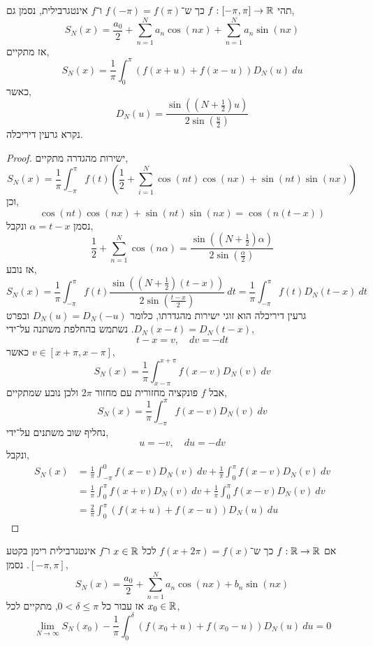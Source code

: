 \begin{theorem}
	תהי $f : [-\pi, \pi] \to \mathbb{R}$ כך ש־$f(-\pi) = f(\pi)$ ו־$f$ אינטגרבילית,
	נסמן גם,
	\[
		S_N(x)
		= \frac{a_0}{2} + \sum_{n = 1}^N a_n \cos(n x) + \sum_{n = 1}^N a_n \sin(n x)
	\]
	אז מתקיים,
	\[
		S_N(x)
		= \frac{1}{\pi} \int_{0}^{\pi} (f(x + u) + f(x - u)) D_N(u)\ du
	\]
	כאשר,
	\[
		D_N(u)
		= \frac{\sin( (N + \frac{1}{2})u)}{2 \sin(\frac{u}{2})}
	\]
	נקרא גרעין דיריכלה.
\end{theorem}
\begin{proof}
	ישירות מהגדרה מתקיים,
	\[
		S_N(x)
		= \frac{1}{\pi} \int_{-\pi}^{\pi} f(t) \left( \frac{1}{2} + \sum_{i = 1}^N \cos(nt) \cos(nx) + \sin(nt) \sin(nx) \right)
	\]
	וכן,
	\[
		\cos(nt) \cos(nx) + \sin(nt) \sin(nx)
		= \cos(n(t - x))
	\]
	נסמן $\alpha = t - x$ ונקבל,
	\[
		\frac{1}{2} + \sum_{n = 1}^N \cos(n \alpha)
		= \frac{\sin((N + \frac{1}{2}) \alpha)}{2 \sin(\frac{\alpha}{2})}
	\]
	אז נובע,
	\[
		S_N(x)
		= \frac{1}{\pi} \int_{-\pi}^{\pi} f(t) \frac{\sin((N + \frac{1}{2}) (t - x))}{2 \sin(\frac{t - x}{2})}\ dt
		= \frac{1}{\pi} \int_{-\pi}^{\pi} f(t) D_N(t - x)\ dt
	\]
	גרעין דיריכלה הוא זוגי ישירות מהגדרתו, כלומר $D_N(u) = D_N(-u)$ ובפרט $D_N(x - t) = D_N(t - x)$.
	נשתמש בהחלפת משתנה על־ידי,
	\[
		t - x = v,
		\quad
		dv = -dt
	\]
	כאשר $v \in [x + \pi, x - \pi]$,
	\[
		S_N(x)
		= \frac{1}{\pi} \int_{x - \pi}^{x + \pi} f(x - v) D_N(v)\ dv
	\]
	אבל $f$ פונקציה מחזורית עם מחזור $2 \pi$ ולכן נובע שמתקיים,
	\[
		S_N(x)
		= \frac{1}{\pi} \int_{-\pi}^{\pi} f(x - v) D_N(v)\ dv
	\]
	נחליף שוב משתנים על־ידי,
	\[
		u = -v,
		\quad
		du = -dv
	\]
	ונקבל,
	\begin{align*}
		S_N(x)
		& = \frac{1}{\pi} \int_{-\pi}^{0} f(x - v) D_N(v)\ dv + \frac{1}{\pi} \int_{0}^{\pi} f(x - v) D_N(v)\ dv \\
		& = \frac{1}{\pi} \int_{0}^{\pi} f(x + v) D_N(v)\ dv + \frac{1}{\pi} \int_{0}^{\pi} f(x - v) D_N(v)\ dv \\
		& = \frac{2}{\pi} \int_{0}^{\pi} (f(x + u) + f(x - u)) D_N(u)\ du
	\end{align*}
\end{proof}
\begin{theorem}
	אם $f : \mathbb{R} \to \mathbb{R}$ כך ש־$f(x + 2 \pi) = f(x)$ לכל $x \in \mathbb{R}$ ו־$f$ אינטגרבילית רימן בקטע $[-\pi, \pi]$.
	נסמן,
	\[
		S_N(x)
		= \frac{a_0}{2} + \sum_{n = 1}^N a_n \cos(nx) + b_n \sin(nx)
	\]
	אז עבור כל $0 < \delta \le \pi$, מתקיים לכל $x_0 \in \mathbb{R}$,
	\[
		\lim_{N \to \infty} S_N(x_0) - \frac{1}{\pi} \int_{0}^{\delta} (f(x_0 + u) + f(x_0 - u)) D_N(u)\ du = 0
	\]
\end{theorem}
